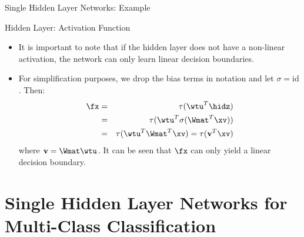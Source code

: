 \begin{frame} {Single Hidden Layer Networks: Example}
\begin{figure}
  \end{figure}
\end{frame}

\begin{frame} {Hidden Layer: Activation Function}
\begin{itemize}
\item It is important to note that if the hidden layer does not have a non-linear activation, the network can only learn linear decision boundaries.
\item For simplification purposes, we drop the bias terms in notation and let $\sigma = \text{id}$. Then:
    \begin{eqnarray*}
        \fx & = & \tau(\wtu^T \hidz) \\
         & = & \tau(\wtu^T \sigma(\Wmat^T \xv)) \\
         & = & \tau(\wtu^T\Wmat^T \xv) = \tau(\mathbf{v}^T \xv)
      \end{eqnarray*}
      where $ \mathbf{v} = \Wmat\wtu$. It can be seen that $\fx$ can only yield a linear decision boundary.
  \end{itemize}
\end{frame}

\section{Single Hidden Layer Networks for Multi-Class Classification}

